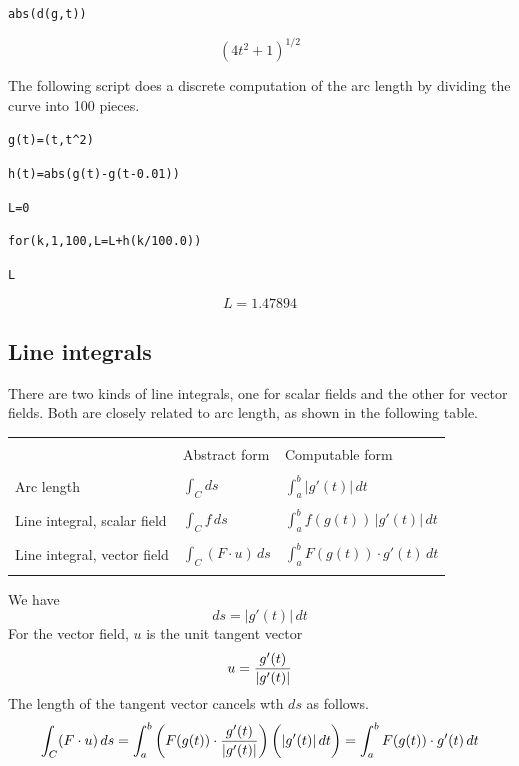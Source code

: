 \medskip
\verb$abs(d(g,t))$

$$(4t^2+1)^{1/2}$$

\medskip
\noindent
The following script does a discrete computation of the arc length by dividing
the curve into 100 pieces.

\medskip
\verb$g(t)=(t,t^2)$

\verb$h(t)=abs(g(t)-g(t-0.01))$

\verb$L=0$

\verb$for(k,1,100,L=L+h(k/100.0))$

\verb$L$

$$L=1.47894$$

\newpage

\subsection{Line integrals}

There are two kinds of line integrals, one for scalar fields and the other
for vector fields.
Both are closely related to arc length, as shown in the following table.

\bigskip

\begin{center}
\begin{tabular}{|lll|}
\hline
 & & \\
& Abstract form
& Computable form
\\
 & & \\
Arc length
& $\displaystyle{\int_C ds}$
& $\displaystyle{\int_a^b |g'(t)|\,dt}$
\\
 & & \\
Line integral, scalar field
& $\displaystyle{\int_C f\,ds}$
& $\displaystyle{\int_a^b f(g(t))\,|g'(t)|\,dt}$
\\
 & & \\
Line integral, vector field
& $\displaystyle{\int_C(F\cdot u)\,ds}$
& $\displaystyle{\int_a^b F(g(t))\cdot g'(t)\,dt}$
\\
 & & \\
\hline
\end{tabular}
\end{center}

\bigskip
\noindent
We have
$$ds=|g'(t)|\,dt$$
For the vector field, $u$ is the unit tangent vector
$$u={g'(t)\over|g'(t)|}$$
The length of the tangent vector cancels wth $ds$
as follows.
$$\int_C(F\cdot u)\,ds
=\int_a^b\bigg(F(g(t))\cdot{g'(t)\over|g'(t)|}\bigg)\,\bigg(|g'(t)|\,dt\bigg)
=\int_a^b F(g(t))\cdot g'(t)\,dt
$$

